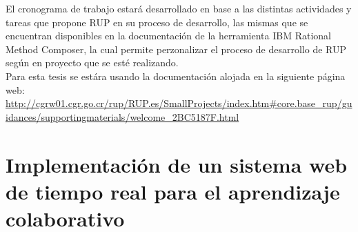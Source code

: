 El cronograma de trabajo estará desarrollado en base a las distintas actividades y tareas que propone RUP en su proceso de desarrollo, las mismas que se encuentran disponibles en la documentación de la herramienta IBM Rational Method Composer, la cual permite perzonalizar el proceso de desarrollo de RUP según en proyecto que se esté realizando.\\

Para esta tesis se estára usando la documentación alojada en la siguiente página web: \url{http://cgrw01.cgr.go.cr/rup/RUP.es/SmallProjects/index.htm#core.base_rup/guidances/supportingmaterials/welcome_2BC5187F.html}




\section{Implementación de un sistema web de tiempo real para el aprendizaje colaborativo}

\section{}